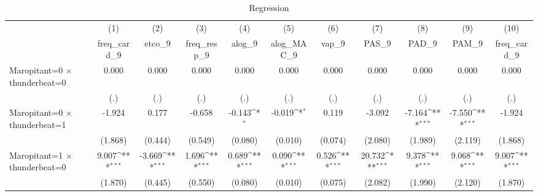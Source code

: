 \begin{table}[htbp]\centering
\def\sym#1{\ifmmode^{#1}\else\(^{#1}\)\fi}
\caption{Regression}
\begin{tabular}{l*{10}{c}}
\toprule
                    &\multicolumn{1}{c}{(1)}&\multicolumn{1}{c}{(2)}&\multicolumn{1}{c}{(3)}&\multicolumn{1}{c}{(4)}&\multicolumn{1}{c}{(5)}&\multicolumn{1}{c}{(6)}&\multicolumn{1}{c}{(7)}&\multicolumn{1}{c}{(8)}&\multicolumn{1}{c}{(9)}&\multicolumn{1}{c}{(10)}\\
                    &\multicolumn{1}{c}{freq\_card\_9}&\multicolumn{1}{c}{etco\_9}&\multicolumn{1}{c}{freq\_resp\_9}&\multicolumn{1}{c}{alog\_9}&\multicolumn{1}{c}{alog\_MAC\_9}&\multicolumn{1}{c}{vap\_9}&\multicolumn{1}{c}{PAS\_9}&\multicolumn{1}{c}{PAD\_9}&\multicolumn{1}{c}{PAM\_9}&\multicolumn{1}{c}{freq\_card\_9}\\
\midrule
Maropitant=0 $\times$ thunderbeat=0&       0.000         &       0.000         &       0.000         &       0.000         &       0.000         &       0.000         &       0.000         &       0.000         &       0.000         &       0.000         \\
                    &         (.)         &         (.)         &         (.)         &         (.)         &         (.)         &         (.)         &         (.)         &         (.)         &         (.)         &         (.)         \\
\addlinespace
Maropitant=0 $\times$ thunderbeat=1&      -1.924         &       0.177         &      -0.658         &      -0.143\sym{*}  &      -0.019\sym{*}  &       0.119         &      -3.092         &      -7.164\sym{***}&      -7.550\sym{***}&      -1.924         \\
                    &     (1.868)         &     (0.444)         &     (0.549)         &     (0.080)         &     (0.010)         &     (0.074)         &     (2.080)         &     (1.989)         &     (2.119)         &     (1.868)         \\
\addlinespace
Maropitant=1 $\times$ thunderbeat=0&       9.007\sym{***}&      -3.669\sym{***}&       1.696\sym{***}&       0.689\sym{***}&       0.090\sym{***}&       0.526\sym{***}&      20.732\sym{***}&       9.378\sym{***}&       9.068\sym{***}&       9.007\sym{***}\\
                    &     (1.870)         &     (0.445)         &     (0.550)         &     (0.080)         &     (0.010)         &     (0.075)         &     (2.082)         &     (1.990)         &     (2.120)         &     (1.870)         \\

\end{tabular}
\end{table}
